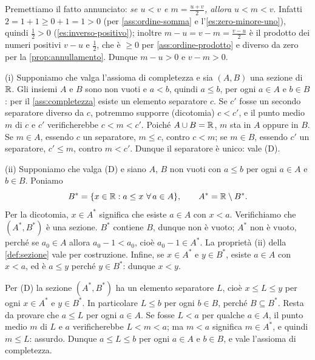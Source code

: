 \begin{dimostrazione}
Premettiamo il fatto annunciato: \emph{se $u<v$ e $m=\frac{u+v}{2}$, allora $u<m<v$}.
Infatti $2=1+1\ge0+1=1>0$ (per \ref{ass:ordine-somma} e l'\cref{es:zero-minore-uno}),
quindi $\frac12>0$ (\cref{es:inverso-positivo}); inoltre $m-u=v-m=\frac{v-u}{2}$ è il
prodotto dei numeri positivi $v-u$ e $\frac12$, che è $\ge0$ per
\ref{ass:ordine-prodotto} e diverso da zero per la \cref{prop:annullamento}. Dunque
$m-u>0$ e $v-m>0$.

(i) Supponiamo che valga l'assioma di completezza e sia $(A,B)$ una sezione di $\mathbb{R}$. Gli
insiemi $A$ e $B$ sono non vuoti e $a<b$, quindi $a\le b$, per ogni $a\in A$ e $b\in B$:
per il \cref{ass:completezza} esiste un elemento separatore $c$. Se $c'$ fosse un secondo
separatore diverso da $c$, potremmo supporre (dicotomia) $c<c'$, e il punto medio $m$ di
$c$ e $c'$ verificherebbe $c<m<c'$. Poiché $A\cup B=\mathbb{R}$, $m$ sta in $A$ oppure in $B$.
Se $m\in A$, essendo $c$ un separatore, $m\le c$, contro $c<m$; se $m\in B$, essendo $c'$
un separatore, $c'\le m$, contro $m<c'$. Dunque il separatore è unico: vale (D).

(ii) Supponiamo che valga (D) e siano $A$, $B$ non vuoti con $a\le b$ per ogni $a\in A$ e
$b\in B$. Poniamo
\[
  B^{*}=\{x\in\mathbb{R} : a\le x \ \forall\, a\in A\}, \qquad A^{*}=\mathbb{R}\setminus B^{*}.
\]
Per la dicotomia, $x\in A^{*}$ significa che esiste $a\in A$ con $x<a$. Verifichiamo che
$(A^{*},B^{*})$ è una sezione. $B^{*}$ contiene $B$, dunque non è vuoto; $A^{*}$ non è
vuoto, perché se $a_{0}\in A$ allora $a_{0}-1<a_{0}$, cioè $a_{0}-1\in A^{*}$. La
proprietà (ii) della \cref{def:sezione} vale per costruzione. Infine, se $x\in A^{*}$ e
$y\in B^{*}$, esiste $a\in A$ con $x<a$, ed è $a\le y$ perché $y\in B^{*}$: dunque $x<y$.

Per (D) la sezione $(A^{*},B^{*})$ ha un elemento separatore $L$, cioè $x\le L\le y$ per
ogni $x\in A^{*}$ e $y\in B^{*}$. In particolare $L\le b$ per ogni $b\in B$, perché
$B\subseteq B^{*}$. Resta da provare che $a\le L$ per ogni $a\in A$. Se fosse $L<a$ per
qualche $a\in A$, il punto medio $m$ di $L$ e $a$ verificherebbe $L<m<a$; ma $m<a$
significa $m\in A^{*}$, e quindi $m\le L$: assurdo. Dunque $a\le L\le b$ per ogni $a\in
A$ e $b\in B$, e vale l'assioma di completezza.
\end{dimostrazione}

